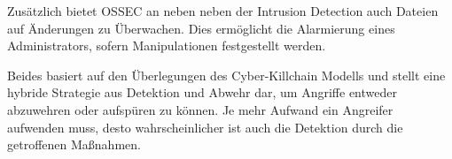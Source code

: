 Zusätzlich bietet OSSEC an neben neben der Intrusion Detection auch Dateien auf Änderungen zu Überwachen. Dies ermöglicht die Alarmierung eines Administrators, sofern Manipulationen festgestellt werden.


Beides basiert auf den Überlegungen des Cyber-Killchain Modells und stellt eine hybride Strategie aus Detektion und Abwehr dar, um Angriffe entweder abzuwehren oder aufspüren zu können. Je mehr Aufwand ein Angreifer aufwenden muss, desto wahrscheinlicher ist auch die Detektion durch die getroffenen Maßnahmen.